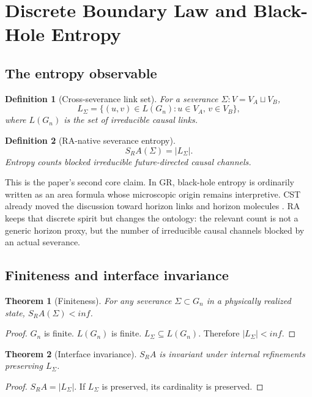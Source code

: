 \documentclass[11pt]{article}
\def\mathrm#1{#1}%
\def\infty{inf}%
\def\SRa{S_RA}%
\newtheorem{definition}{Definition}
\newtheorem{theorem}{Theorem}
\newcommand{\SRa}{\ensuremath{S_{\mathrm{RA}}}}
\begin{document}
\section{Discrete Boundary Law and Black-Hole Entropy}
\label{sec:entropy}

\subsection{The entropy observable}

\begin{definition}[Cross-severance link set]
For a severance $\Sigma:V=V_A\sqcup V_B$,
\[
L_\Sigma=\{(u,v)\in L(G_n):u\in V_A,\,v\in V_B\},
\]
where $L(G_n)$ is the set of irreducible causal links.
\end{definition}

\begin{definition}[RA-native severance entropy]
\[
\boxed{\SRa(\Sigma)=|L_\Sigma|.}
\]
Entropy counts blocked irreducible future-directed causal channels.
\end{definition}

This is the paper's second core claim. In GR, black-hole entropy is ordinarily written as an area formula whose microscopic origin remains interpretive. CST already moved the discussion toward horizon links and horizon molecules \cite{Dou2003,Barton2019,Homsak2024}. RA keeps that discrete spirit but changes the ontology: the relevant count is not a generic horizon proxy, but the number of irreducible causal channels blocked by an actual severance.

\subsection{Finiteness and interface invariance}

\begin{theorem}[Finiteness]
For any severance $\Sigma\subset G_n$ in a physically realized state, $\SRa(\Sigma)<\infty$.
\end{theorem}
\begin{proof}
$G_n$ is finite. $L(G_n)$ is finite. $L_\Sigma\subseteq L(G_n)$. Therefore $|L_\Sigma|<\infty$.
\end{proof}

\begin{theorem}[Interface invariance]
$\SRa$ is invariant under internal refinements preserving $L_\Sigma$.
\end{theorem}
\begin{proof}
$\SRa=|L_\Sigma|$. If $L_\Sigma$ is preserved, its cardinality is preserved.
\end{proof}
\end{document}
